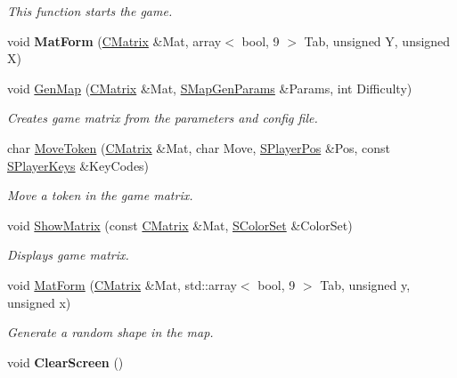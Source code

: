 \begin{DoxyCompactItemize}
\begin{DoxyCompactList}\small\item\em This function starts the game. \end{DoxyCompactList}\item 
\hypertarget{namespace_chase_game_a9185adb7d1dfecc89b9b9217af3606cd}{void {\bfseries Mat\-Form} (\hyperlink{namespace_chase_game_a469449f9237e59efce3982127366c550}{C\-Matrix} \&Mat, array$<$ bool, 9 $>$ Tab, unsigned Y, unsigned X)}\label{namespace_chase_game_a9185adb7d1dfecc89b9b9217af3606cd}

\item 
void \hyperlink{namespace_chase_game_a5b00d5d3acd009bc9e2e315180e25825}{Gen\-Map} (\hyperlink{namespace_chase_game_a469449f9237e59efce3982127366c550}{C\-Matrix} \&Mat, \hyperlink{struct_chase_game_1_1_s_map_gen_params}{S\-Map\-Gen\-Params} \&Params, int Difficulty)
\begin{DoxyCompactList}\small\item\em Creates game matrix from the parameters and config file. \end{DoxyCompactList}\item 
char \hyperlink{namespace_chase_game_a1b0d964656a1a14bacc9f316a78c0d46}{Move\-Token} (\hyperlink{namespace_chase_game_a469449f9237e59efce3982127366c550}{C\-Matrix} \&Mat, char Move, \hyperlink{struct_chase_game_1_1_s_player_pos}{S\-Player\-Pos} \&Pos, const \hyperlink{struct_chase_game_1_1_s_player_keys}{S\-Player\-Keys} \&Key\-Codes)
\begin{DoxyCompactList}\small\item\em Move a token in the game matrix. \end{DoxyCompactList}\item 
void \hyperlink{namespace_chase_game_acb17bc4accc14fb3d00a3aab9db3d822}{Show\-Matrix} (const \hyperlink{namespace_chase_game_a469449f9237e59efce3982127366c550}{C\-Matrix} \&Mat, \hyperlink{struct_chase_game_1_1_s_color_set}{S\-Color\-Set} \&Color\-Set)
\begin{DoxyCompactList}\small\item\em Displays game matrix. \end{DoxyCompactList}\item 
void \hyperlink{namespace_chase_game_a898617fa128716a9f402b6b44bd41c5c}{Mat\-Form} (\hyperlink{namespace_chase_game_a469449f9237e59efce3982127366c550}{C\-Matrix} \&Mat, std\-::array$<$ bool, 9 $>$ Tab, unsigned y, unsigned x)
\begin{DoxyCompactList}\small\item\em Generate a random shape in the map. \end{DoxyCompactList}\item 
\hypertarget{namespace_chase_game_a3a7382465f6f23fe77cde4e589fb80d6}{void {\bfseries Clear\-Screen} ()}\label{namespace_chase_game_a3a7382465f6f23fe77cde4e589fb80d6}


\end{DoxyCompactItemize}
